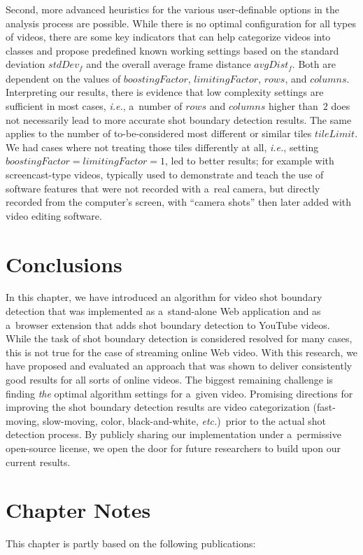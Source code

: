 Second, more advanced heuristics for the various user-definable
options in the analysis process are possible.
While there is no optimal configuration for all types of videos,
there are some key indicators that can help categorize videos
into classes and propose predefined known working settings
based on the standard deviation $\mathit{stdDev_{f}}$
and the overall average frame distance $\mathit{avgDist_{f}}$.
Both are dependent on the values of $\mathit{boostingFactor}$,
$\mathit{limitingFactor}$, $\mathit{rows}$, and $\mathit{columns}$. 
Interpreting our results, there is evidence
that low complexity settings are sufficient in most cases,
\emph{i.e.}, a~number of $\mathit{rows}$ and $\mathit{columns}$
higher than~$\mathit{2}$ does not necessarily
lead to more accurate shot boundary detection results.
The same applies to the number of to-be-considered most different
or similar tiles $\mathit{tileLimit}$.
We had cases where not treating those tiles differently
at all, \emph{i.e.}, setting
$\mathit{boostingFactor} = \mathit{limitingFactor} = \mathit{1}$, 
led to better results; for example with screencast-type videos,
typically used to demonstrate and teach the use of software features
that were not recorded with a~real camera,
but directly recorded from the computer's screen, with ``camera shots''
then later added with video editing software.

\section{Conclusions}

In this chapter, we have introduced an algorithm for video shot boundary detection
that was implemented as a~stand-alone Web application
and as a~browser extension that adds shot boundary detection to YouTube videos.
While the task of shot boundary detection is considered resolved for many cases,
this is not true for the case of streaming online Web video.
With this research, we have proposed and evaluated an approach
that was shown to deliver consistently good results for all sorts of online videos.
The biggest remaining challenge is finding \emph{the} optimal algorithm settings
for a~given video.
Promising directions for improving the shot boundary detection results
are video categorization (fast-moving, slow-moving, color, black-and-white, \emph{etc.})\ prior
to the actual shot detection process.
By publicly sharing our implementation under a~permissive open-source license,
we open the door for future researchers to build upon our current results.

\section*{Chapter Notes}
This chapter is partly based on the following publications:




